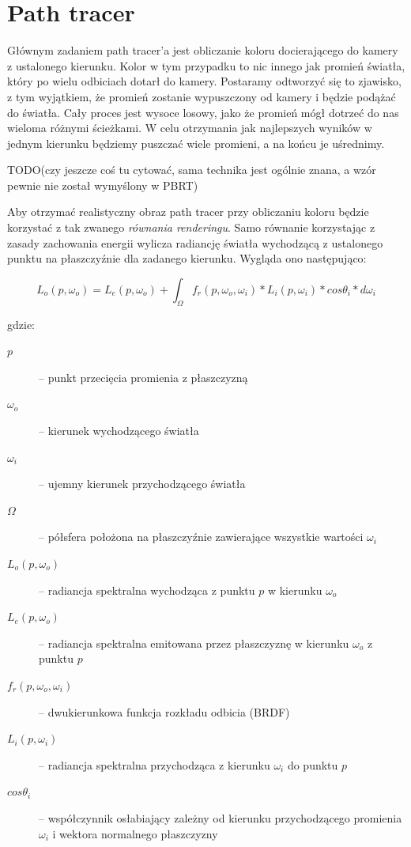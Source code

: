 \documentclass[inz,longabstract]{iithesis}
\begin{document}
    \section{Path tracer}
        Głównym zadaniem path tracer'a jest obliczanie koloru docierającego do kamery z ustalonego kierunku. Kolor w tym przypadku to nic innego jak promień światła, który po wielu odbiciach dotarł do kamery. Postaramy odtworzyć się to zjawisko, z tym wyjątkiem, że promień zostanie wypuszczony od kamery i będzie podążać do światła. Cały proces jest wysoce losowy, jako że promień mógł dotrzeć do nas wieloma różnymi ścieżkami. W celu otrzymania jak najlepszych wyników w jednym kierunku będziemy puszczać wiele promieni, a na końcu je uśrednimy.
        
        TODO(czy jeszcze coś tu cytować, sama technika jest ogólnie znana, a wzór pewnie nie został wymyślony w PBRT) 
        
        Aby otrzymać realistyczny obraz path tracer przy obliczaniu koloru będzie korzystać z tak zwanego \textit{równania renderingu}. Samo równanie korzystając z zasady zachowania energii wylicza radiancję światła wychodzącą z ustalonego punktu na płaszczyźnie dla zadanego kierunku. Wygląda ono następująco:
        
        \begin{equation*}
            L_o(p, \omega_o) = L_e(p, \omega_o) + \int_{\Omega} f_r(p, \omega_o, \omega_i) * L_i(p, \omega_i)*cos\theta_i*d\omega_i
        \end{equation*}
        
        gdzie:
        
        \begin{description}
            \item[$p$] -- punkt przecięcia promienia z płaszczyzną
            \item[$\omega_o$] -- kierunek wychodzącego światła
            \item[$\omega_i$] -- ujemny kierunek przychodzącego światła
            \item[$\Omega$] -- półsfera położona na płaszczyźnie zawierające wszystkie wartości $\omega_i$ 
            \item[$L_o(p, \omega_o)$] -- radiancja spektralna wychodząca z punktu $p$ w kierunku $\omega_o$
            \item[$L_e(p, \omega_o)$] -- radiancja spektralna emitowana przez płaszczyznę w kierunku $\omega_o$ z punktu $p$  
            \item[$f_r(p, \omega_o, \omega_i)$] -- dwukierunkowa funkcja rozkładu odbicia (BRDF)
            \item[$L_i(p, \omega_i)$] -- radiancja spektralna przychodząca z kierunku $\omega_i$ do punktu $p$
            \item[$cos\theta_i$] -- współczynnik osłabiający zależny od kierunku przychodzącego promienia $\omega_i$ i wektora normalnego płaszczyzny
        \end{description}
\end{document}
